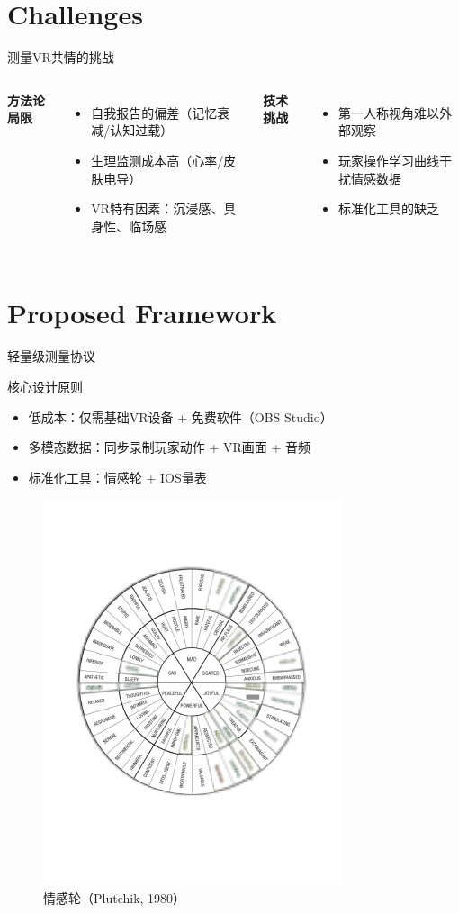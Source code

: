 \documentclass[aspectratio=169,xcolor=dvipsnames]{beamer}
\begin{document}
\section{Challenges}

\begin{frame}{测量VR共情的挑战}
    \begin{columns}[t]
        \textbf{方法论局限}
        \begin{itemize}
            \item 自我报告的偏差（记忆衰减/认知过载）
            \item 生理监测成本高（心率/皮肤电导）
            \item VR特有因素：沉浸感、具身性、临场感
        \end{itemize}
        
        \textbf{技术挑战}
        \begin{itemize}
            \item 第一人称视角难以外部观察
            \item 玩家操作学习曲线干扰情感数据
            \item 标准化工具的缺乏
        \end{itemize}
    \end{columns}
\end{frame}

\section{Proposed Framework}

\begin{frame}{轻量级测量协议}
    \begin{block}{核心设计原则}
        \begin{itemize}
            \item 低成本：仅需基础VR设备 + 免费软件（OBS Studio）
            \item 多模态数据：同步录制玩家动作 + VR画面 + 音频
            \item 标准化工具：情感轮 + IOS量表
        \end{itemize}
    \end{block}
    
    \begin{figure}
        \includegraphics[width=0.3\linewidth]{g1434.pdf}  %
        \caption{情感轮（Plutchik, 1980）}
    \end{figure}
\end{frame}
\end{document}
